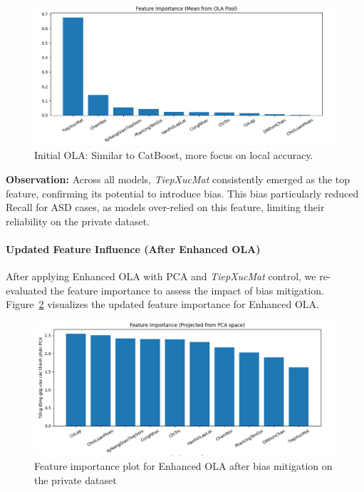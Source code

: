 \documentclass[conference]{IEEEtran}
\begin{document}
\begin{figure}[H]
    \centering
    \includegraphics[width=0.9\linewidth]{images/feature_ola.png}
    \caption{Initial OLA: Similar to CatBoost, more focus on local accuracy.}
    \label{fig:x4}
    \end{figure}

\noindent\textbf{Observation:} Across all models, \textit{TiepXucMat} consistently emerged as the top feature, confirming its potential to introduce bias. This bias particularly reduced Recall for ASD cases, as models over-relied on this feature, limiting their reliability on the private dataset.

\paragraph{Updated Feature Influence (After Enhanced OLA)}
After applying Enhanced OLA with PCA and \textit{TiepXucMat} control, we re-evaluated the feature importance to assess the impact of bias mitigation. Figure~\ref{fig:importance_after} visualizes the updated feature importance for Enhanced OLA.

\begin{figure}[H]
\centering
\includegraphics[width=0.9\linewidth]{images/feature_enhanced_ola.png}
\caption{Feature importance plot for Enhanced OLA after bias mitigation on the private dataset}
\label{fig:importance_after}
\end{figure}
\end{document}
